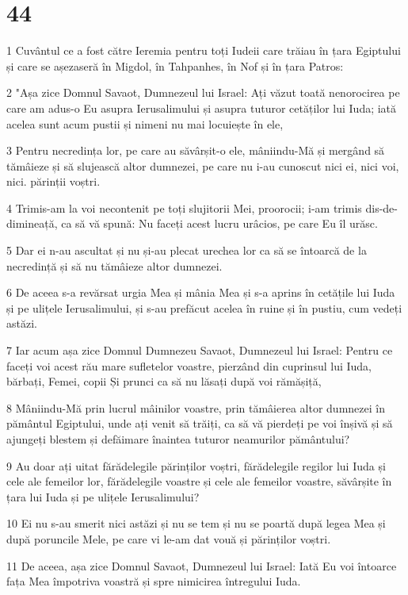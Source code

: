 \chapter{44}

\par 1 Cuvântul ce a fost către Ieremia pentru toți Iudeii care trăiau în țara Egiptului și care se așezaseră în Migdol, în Tahpanhes, în Nof și în țara Patros:
\par 2 "Așa zice Domnul Savaot, Dumnezeul lui Israel: Ați văzut toată nenorocirea pe care am adus-o Eu asupra Ierusalimului și asupra tuturor cetăților lui Iuda; iată acelea sunt acum pustii și nimeni nu mai locuiește în ele,
\par 3 Pentru necredința lor, pe care au săvârșit-o ele, mâniindu-Mă și mergând să tămâieze și să slujească altor dumnezei, pe care nu i-au cunoscut nici ei, nici voi, nici. părinții voștri.
\par 4 Trimis-am la voi necontenit pe toți slujitorii Mei, proorocii; i-am trimis dis-de-dimineață, ca să vă spună: Nu faceți acest lucru urâcios, pe care Eu îl urăsc.
\par 5 Dar ei n-au ascultat și nu și-au plecat urechea lor ca să se întoarcă de la necredință și să nu tămâieze altor dumnezei.
\par 6 De aceea s-a revărsat urgia Mea și mânia Mea și s-a aprins în cetățile lui Iuda și pe ulițele Ierusalimului, și s-au prefăcut acelea în ruine și în pustiu, cum vedeți astăzi.
\par 7 Iar acum așa zice Domnul Dumnezeu Savaot, Dumnezeul lui Israel: Pentru ce faceți voi acest rău mare sufletelor voastre, pierzând din cuprinsul lui Iuda, bărbați, Femei, copii Și prunci ca să nu lăsați după voi rămășiță,
\par 8 Mâniindu-Mă prin lucrul mâinilor voastre, prin tămâierea altor dumnezei în pământul Egiptului, unde ați venit să trăiți, ca să vă pierdeți pe voi înșivă și să ajungeți blestem și defăimare înaintea tuturor neamurilor pământului?
\par 9 Au doar ați uitat fărădelegile părinților voștri, fărădelegile regilor lui Iuda și cele ale femeilor lor, fărădelegile voastre și cele ale femeilor voastre, săvârșite în țara lui Iuda și pe ulițele Ierusalimului?
\par 10 Ei nu s-au smerit nici astăzi și nu se tem și nu se poartă după legea Mea și după poruncile Mele, pe care vi le-am dat vouă și părinților voștri.
\par 11 De aceea, așa zice Domnul Savaot, Dumnezeul lui Israel: Iată Eu voi întoarce fața Mea împotriva voastră și spre nimicirea întregului Iuda.
